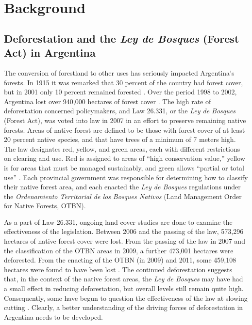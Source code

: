 \chapter{Background}
\section{Deforestation and the \textit{Ley de Bosques} (Forest Act) in Argentina}

The conversion of forestland to other uses has seriously impacted Argentina’s forests. In 1915 it was remarked that 30 percent of the country had forest cover, but in 2001 only 10 percent remained forested \autocite{secretaria-de-d2001primer}. Over the period 1998 to 2002, Argentina lost over 940,000 hectares of forest cover \autocite{secretaria-de-a2007informe}. The high rate of deforestation concerned policymakers, and Law 26.331, or the \textit{Ley de Bosques} (Forest Act), was voted into law in 2007 in an effort to preserve remaining native forests. Areas of native forest are defined to be those with forest cover of at least 20 percent native species, and that have trees of a minimum of 7 meters high. The law designates red, yellow, and green areas, each with different restrictions on clearing and use. Red is assigned to areas of “high conservation value,” yellow is for areas that must be managed sustainably, and green allows “partial or total use” \autocite[25]{gulezian2009environmental}. Each provincial government was responsible for determining how to classify their native forest area, and each enacted the \textit{Ley de Bosques} regulations under the \textit{Ordenamiento Territorial de los Bosques Nativos} (Land Management Order for Native Forests, OTBN).

As a part of Law 26.331, ongoing land cover studies are done to examine the effectiveness of the legislation. Between 2006 and the passing of the law, 573,296 hectares of native forest cover were lost. From the passing of the law in 2007 and the classification of the OTBN areas in 2009, a further 473,001 hectares were deforested. From the enacting of the OTBN (in 2009) and 2011, some 459,108 hectares were found to have been lost \autocite{secreteria-de-a2012monitoreo}. The continued deforestation suggests that, in the context of the native forest areas, the \textit{Ley de Bosques} may have had a small effect in reducing deforestation, but overall levels still remain quite high. Consequently, some have begun to question the effectiveness of the law at slowing cutting \autocites{valpreda2012the-protection}{greenpeace-arge2013ley-de-bosques:}. Clearly, a better understanding of the driving forces of deforestation in Argentina needs to be developed.

